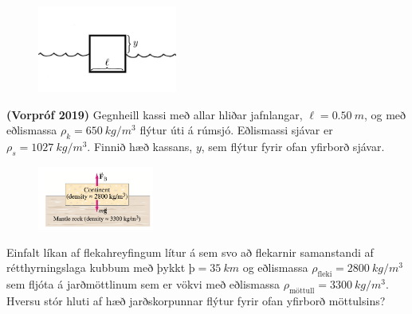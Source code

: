 \ifdefined \wholebook \else\documentclass[oneside]{book}\usepackage{EdlBook}\graphicspath{{figures/}}
\begin{document}
\begin{enumerate}[label = \textbf{Dæmi \thechapter.\arabic*.}]
\begin{minipage}{\linewidth}
\end{minipage}

\vspace{2cm}


\begin{minipage}{\linewidth}

\begin{figure}
\vspace{-1.5cm}
\includegraphics[width=1.8in]{images/kubbursjor.png}
\end{figure}

\item \textbf{(Vorpróf 2019)} Gegnheill kassi með allar hliðar jafnlangar, $\ell = \SI{0.50}{m}$, og með eðlismassa $\rho_k = \SI{650}{kg/m^3}$ flýtur úti á rúmsjó. Eðlismassi sjávar er $\rho_s = \SI{1027}{kg/m^3}$. Finnið hæð kassans, $y$, sem flýtur fyrir ofan yfirborð sjávar.

\end{minipage}

\vspace{0.4cm}

\begin{minipage}{\linewidth}

\begin{figure}
\vspace{-1cm}
\includegraphics[width=1.5in]{images/jardskorpa.png}
\end{figure}

\item Einfalt líkan af flekahreyfingum lítur á sem svo að flekarnir samanstandi af rétthyrningslaga kubbum með þykkt $þ = \SI{35}{km}$ og eðlismassa $\rho_{\text{fleki}} = \SI{2800}{kg/m^3}$ sem fljóta á jarðmöttlinum sem er vökvi með eðlismassa $\rho_{\text{möttull}} = \SI{3300}{kg/m^3}$. Hversu stór hluti af hæð jarðskorpunnar flýtur fyrir ofan yfirborð möttulsins?
\end{minipage}




\end{enumerate}
\end{document}
